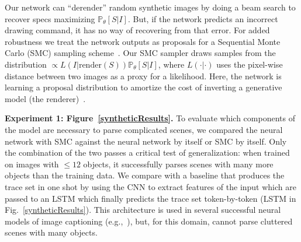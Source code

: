 \documentclass{article}
\newcommand{\probability}{\mathds{P}} %
\theoremstyle{definition}
\begin{document}
Our network can ``derender'' random synthetic images
by doing a beam search to
recover  specs maximizing $\probability_\theta[S|I]$. %
 But, if the network predicts an incorrect
drawing command, it has no way of recovering from that error.  
For added robustness %
we treat the
 network outputs as proposals for a Sequential Monte Carlo (SMC) sampling scheme~\citep{SMCBook}.
Our SMC sampler draws samples
from the distribution $\propto L(I|\text{render}(S))
\probability_\theta[S|I]$, where $L(\cdot | \cdot)$
uses the pixel-wise distance between two images as a proxy for a
likelihood.
Here, the network is learning a proposal distribution to amortize the cost of inverting a generative model (the renderer)~\citep{paige2016inference}.


\textbf{Experiment 1: Figure~\ref{syntheticResults}.}
  To evaluate which components of the model are necessary to parse complicated scenes,
  we compared  the neural network
  with SMC against the neural network by
itself or SMC by itself.  Only the combination of the two passes a
critical test of generalization: when trained on images with $\leq 12$
objects, it successfully parses scenes with many more objects than the
training data.
We compare with a baseline that produces the trace set in one shot by
using the CNN to extract features of the input which are passed to an LSTM which finally predicts
the trace set token-by-token (LSTM in Fig.~\ref{syntheticResults}).
This architecture is used in several successful neural models of image captioning (e.g.,~\cite{vinyals2015show}),
but, for this domain, cannot parse cluttered scenes with many objects.
\end{document}
